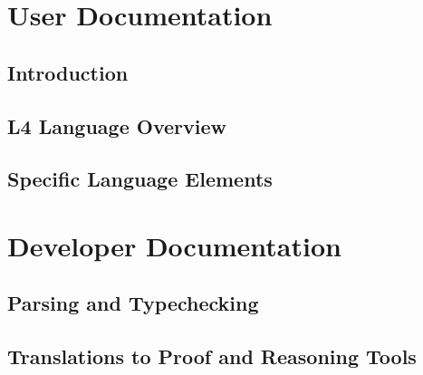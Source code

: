 \documentclass[11pt,a4paper,twoside,headinclude,footexclude]{scrreprt}
\begin{document}




\cleardoublepage


\newpage
\tableofcontents
\listoffigures

\cleardoublepage


\chapter{User Documentation}

\section{Introduction}\label{sec:introduction}



\section{L4 Language Overview}\label{sec:language}


\section{Specific Language Elements}\label{sec:language_elements}


\chapter{Developer Documentation}

\section{Parsing and Typechecking}\label{sec:parsing_typechecking}



\section{Translations to Proof and Reasoning Tools}\label{sec:translations}



\newpage


\end{document}
